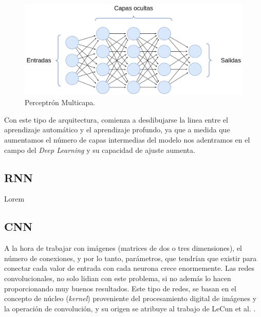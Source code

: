 \begin{figure}[H]
\centering
\includegraphics[width=\linewidth]{imagenes/mlp.png} 
\captionsetup{width=.8\linewidth}
\caption{Perceptrón Multicapa.}
\label{fig:mlp}
\end{figure}

Con este tipo de arquitectura, comienza a desdibujarse la linea entre el aprendizaje automático y el aprendizaje profundo, ya que a medida que aumentamos el número de capas intermedias del modelo nos adentramos en el campo del \textit{Deep Learning} y su capacidad de ajuste aumenta.

\subsection{RNN}
Lorem

\subsection{CNN}
A la hora de trabajar con imágenes (matrices de dos o tres dimensiones), el número de conexiones, y por lo tanto, parámetros, que tendrían que existir para conectar cada valor de entrada con cada neurona crece enormemente. Las redes convolucionales, no solo lidian con este problema, si no además lo hacen proporcionando muy buenos resultados. Este tipo de redes, se basan en el concepto de núcleo (\textit{kernel}) proveniente del procesamiento digital de imágenes y la operación de convolución, y su origen se atribuye al trabajo de LeCun et al. \cite{}.

